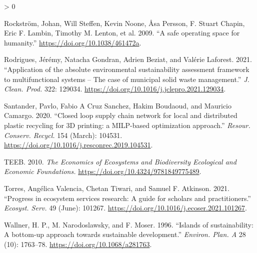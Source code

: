 \documentclass[
]{article}
\newlength{\cslhangindent}
\newenvironment{CSLReferences}[2] %
 {%
  \setlength{\parindent}{0pt}
  \ifodd #1 \everypar{\setlength{\hangindent}{\cslhangindent}}\ignorespaces\fi
  \ifnum #2 > 0
  \setlength{\parskip}{#2\baselineskip}
  \fi
 }%
 {}
\begin{document}
\begin{CSLReferences}{1}{0}
\leavevmode\hypertarget{ref-Rockstrom2009}{}%
Rockström, Johan, Will Steffen, Kevin Noone, Åsa Persson, F. Stuart Chapin, Eric F. Lambin, Timothy M. Lenton, et al. 2009. {``{A safe operating space for humanity}.''} \url{https://doi.org/10.1038/461472a}.

\leavevmode\hypertarget{ref-Rodrigues2021}{}%
Rodrigues, Jérémy, Natacha Gondran, Adrien Beziat, and Valérie Laforest. 2021. {``{Application of the absolute environmental sustainability assessment framework to multifunctional systems -- The case of municipal solid waste management}.''} \emph{J. Clean. Prod.} 322: 129034. \url{https://doi.org/10.1016/j.jclepro.2021.129034}.

\leavevmode\hypertarget{ref-Santander2020}{}%
Santander, Pavlo, Fabio A Cruz Sanchez, Hakim Boudaoud, and Mauricio Camargo. 2020. {``{Closed loop supply chain network for local and distributed plastic recycling for 3D printing: a MILP-based optimization approach}.''} \emph{Resour. Conserv. Recycl.} 154 (March): 104531. \url{https://doi.org/10.1016/j.resconrec.2019.104531}.

\leavevmode\hypertarget{ref-TEEB2010}{}%
TEEB. 2010. \emph{{The Economics of Ecosystems and Biodiversity Ecological and Economic Foundations.}} \url{https://doi.org/10.4324/9781849775489}.

\leavevmode\hypertarget{ref-Torres2021}{}%
Torres, Angélica Valencia, Chetan Tiwari, and Samuel F. Atkinson. 2021. {``{Progress in ecosystem services research: A guide for scholars and practitioners}.''} \emph{Ecosyst. Serv.} 49 (June): 101267. \url{https://doi.org/10.1016/j.ecoser.2021.101267}.

\leavevmode\hypertarget{ref-Wallner1996}{}%
Wallner, H. P., M. Narodoslawsky, and F. Moser. 1996. {``{Islands of sustainability: A bottom-up approach towards sustainable development}.''} \emph{Environ. Plan. A} 28 (10): 1763--78. \url{https://doi.org/10.1068/a281763}.

\end{CSLReferences}
\end{document}
